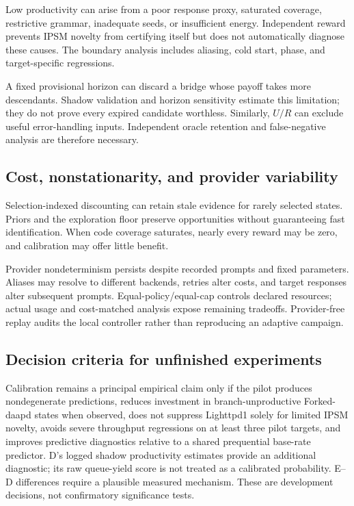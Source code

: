 \documentclass[final,5p,times,number]{elsarticle}
\begin{document}
Low productivity can arise from a poor response proxy, saturated coverage, restrictive grammar, inadequate seeds, or insufficient energy. Independent reward prevents IPSM novelty from certifying itself but does not automatically diagnose these causes. The boundary analysis includes aliasing, cold start, phase, and target-specific regressions.

A fixed provisional horizon can discard a bridge whose payoff takes more descendants. Shadow validation and horizon sensitivity estimate this limitation; they do not prove every expired candidate worthless. Similarly, $U/R$ can exclude useful error-handling inputs. Independent oracle retention and false-negative analysis are therefore necessary.

\subsection{Cost, nonstationarity, and provider variability}
Selection-indexed discounting can retain stale evidence for rarely selected states. Priors and the exploration floor preserve opportunities without guaranteeing fast identification. When code coverage saturates, nearly every reward may be zero, and calibration may offer little benefit.

Provider nondeterminism persists despite recorded prompts and fixed parameters. Aliases may resolve to different backends, retries alter costs, and target responses alter subsequent prompts. Equal-policy/equal-cap controls declared resources; actual usage and cost-matched analysis expose remaining tradeoffs. Provider-free replay audits the local controller rather than reproducing an adaptive campaign.

\subsection{Decision criteria for unfinished experiments}
Calibration remains a principal empirical claim only if the pilot produces nondegenerate predictions, reduces investment in branch-unproductive Forked-daapd states when observed, does not suppress Lighttpd1 solely for limited IPSM novelty, avoids severe throughput regressions on at least three pilot targets, and improves predictive diagnostics relative to a shared prequential base-rate predictor. D's logged shadow productivity estimates provide an additional diagnostic; its raw queue-yield score is not treated as a calibrated probability. E--D differences require a plausible measured mechanism. These are development decisions, not confirmatory significance tests.
\end{document}
